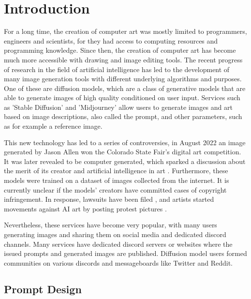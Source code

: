 \chapter{Introduction}
\label{cha:Introduction}

For a long time, the creation of computer art was mostly limited to programmers, engineers and scientists, for they had access to computing resources and programming knowledge. Since then, the creation of computer art has become much more accessible with drawing and image editing tools. The recent progress of research in the field of artificial intelligence has led to the development of many image generation tools with different underlying algorithms and purposes. One of these are diffusion models, which are a class of generative models that are able to generate images of high quality conditioned on user input. Services such as 'Stable Diffusion' \autocite{stable-diffusion} and 'Midjourney' \autocite{midjourney} allow users to generate images and art based on image descriptions, also called the prompt, and other parameters, such as for example a reference image.

This new technology has led to a series of controversies, in August 2022 an image generated by Jason Allen won the Colorado State Fair's digital art competition. It was later revealed to be computer generated, which sparked a discussion about the merit of its creator and artificial intelligence in art \autocite{colorado}. Furthermore, these models were trained on a dataset of images collected from the internet. It is currently unclear if the models' creators have committed cases of copyright infringement. In response, lawsuits have been filed \autocite{getty}, and artists started movements against AI art by posting protest pictures \autocite{no-ai-art}.

Nevertheless, these services have become very popular, with many users generating images and sharing them on social media and dedicated discord channels. Many services have dedicated discord servers or websites where the issued prompts and generated images are published. Diffusion model users formed communities on various discords and messageboards like Twitter and Reddit. 


\section{Prompt Design}

